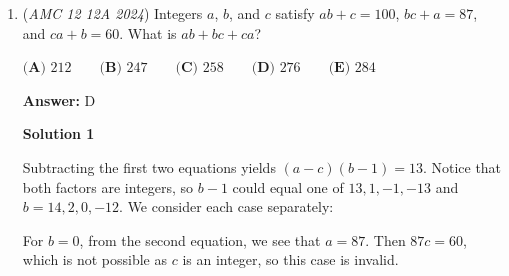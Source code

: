 \begin{enumerate}
 The number of desired arrangements for all cases is $6\cdot (4\cdot 6\cdot 4)$.

 The target probability is $\frac{6\cdot (4\cdot 6\cdot 4)}{12!/(3!\,2!\,1!\,6!)}=\frac{4}{385}.$

 -J.Z.

 



\textbf{Solution 6 (Alternate Solution 3)}

We make no assumptions about which player receives which tokens.

 Let us first distribute the red tokens. It does not matter who the first token goes to, but the second one must go to the same player, in $1$ of their $3$ open spots, out of the total $11$ remaining spots. Similarly, the third red token must go in one of the $2$ open spots out of $10$ remaining.

 Distributing the white tokens next, the first token can go in any of the $9$ remaining spots except for the $1$ spot of the red token player. The second white token must then go in the $3$ open spots of this white token player out of $8$ spots.

 Lastly, the blue token must go in $1$ of the $4$ open spots of the last player, out of a total of $7$ spots. The remaining $6$ black tokens can be distributed however.

 Thus, our probability is $\frac{3}{11} \cdot \frac{2}{10} \cdot \frac{8}{9} \cdot \frac{3}{8} \cdot \frac{4}{7} = \frac{4}{385}$, and so our answer is $4 + 385 = \boxed{\textbf{(C)}\ 389}$.

 


	\item (\textit{AMC 12 12A 2024}) Integers $a$, $b$, and $c$ satisfy $ab + c = 100$, $bc + a = 87$, and $ca + b = 60$. What is $ab + bc + ca$?


 $\textbf{(A) }212 \qquad \textbf{(B) }247 \qquad \textbf{(C) }258 \qquad \textbf{(D) }276 \qquad \textbf{(E) }284 \qquad$

 \textbf{Answer: }D



\textbf{Solution 1}

Subtracting the first two equations yields $(a-c)(b-1)=13$. Notice that both factors are integers, so $b-1$ could equal one of $13,1,-1,-13$ and $b=14,2,0,-12$. We consider each case separately:

 For $b=0$, from the second equation, we see that $a=87$. Then $87c=60$, which is not possible as $c$ is an integer, so this case is invalid.


\end{enumerate}
